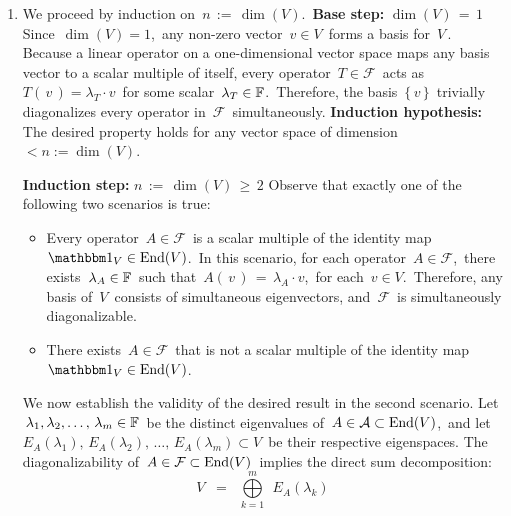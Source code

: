 \begin{enumerate}
\item
    We proceed by induction on \,$n \,:=\, \dim(V)$.\,
    \vskip 0.2cm
    \textbf{Base step:}\; $\dim(V) \,=\, 1$
    \vskip -0.05cm
    Since \,$\dim(V) = 1$,\,
    any non-zero vector \,$v \in V$\, forms a basis for \,$V$\,.
    Because a linear operator on a one-dimensional vector space
    maps any basis vector to a scalar multiple of itself,
    every operator \,$T \in \mathcal{F}$\, acts as
    \,$T(\,v\,) = \lambda_{T} \cdot v$\, for some scalar \,$\lambda_{T} \in \mathbb{F}$.\,
    Therefore, the basis \,$\{\,v\,\}$\, trivially diagonalizes
    every operator in \,$\mathcal{F}$\, simultaneously.
    \vskip 0.2cm
    \textbf{Induction hypothesis:}\; The desired property holds for any vector space of dimension
    \,$< n := \dim(V)$.

    \vskip 0.2cm
    \textbf{Induction step:}\; $n \,:=\, \dim(V) \,\geq\, 2$
    \vskip -0.05cm
    \noindent
    Observe that exactly one of the following two scenarios is true:
    \begin{itemize}
    \item
        Every operator \,$A \in \mathcal{F}$\, is a scalar multiple of
        the identity map \,$\id_{V} \in \End(V)$.\,
        \vskip -0.05cm
        In this scenario, for each operator \,$A \in \mathcal{F}$,\,
        there exists \,$\lambda_{A} \in \mathbb{F}$\, such that
        \,$A(\,v\,) \,=\, \lambda_{A} \cdot v$,\, for each \,$v \in V$.\,
        Therefore, any basis of \,$V$\, consists of simultaneous eigenvectors, and
        \,$\mathcal{F}$\, is simultaneously diagonalizable.
    \item
    	There exists \,$A \in \mathcal{F}$\, that is not a scalar multiple
    	of the identity map \,$\id_{V} \in \End(V)$.\,
        \vskip -0.05cm
    \end{itemize}
    \vskip 0.2cm
    \noindent
    We now establish the validity of the desired result in the second scenario.
    Let \,$\lambda_{1}, \lambda_{2}, \ldots,\, \lambda_{m} \in \mathbb{F}$\,
    be the distinct eigenvalues of \,$A \in \mathcal{A} \subset \textnormal{End}(V)$,\, and let
    \,$E_{A}(\lambda_{1}),\, E_{A}(\lambda_{2}),\, \ldots,\, E_{A}(\lambda_{m}) \subset V$\,
    be their respective eigenspaces.
    The diagonalizability of \,$A \in \mathcal{F} \subset \textnormal{End}(V)$\, implies
    the direct sum decomposition:
    \begin{equation*}
    V
    \;\; = \;\;
        \overset{m}{\underset{k = 1}{\bigoplus}}\;\,
        E_{A}(\lambda_{k})
    \end{equation*}


\end{enumerate}
